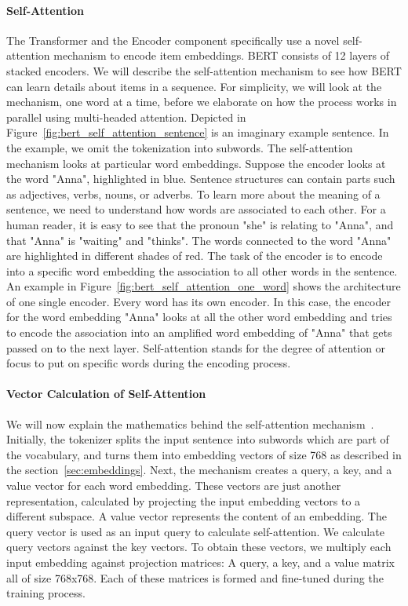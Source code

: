 \paragraph{Self-Attention}
The Transformer and the Encoder component specifically use a novel self-attention mechanism to encode item embeddings. BERT consists of 12 layers of stacked encoders. We will describe the self-attention mechanism to see how BERT can learn details about items in a sequence. For simplicity, we will look at the mechanism, one word at a time, before we elaborate on how the process works in parallel using multi-headed attention. Depicted in Figure~\ref{fig:bert_self_attention_sentence} is an imaginary example sentence. In the example, we omit the tokenization into subwords. The self-attention mechanism looks at particular word embeddings. Suppose the encoder looks at the word "Anna", highlighted in blue. Sentence structures can contain parts such as adjectives, verbs, nouns, or adverbs. To learn more about the meaning of a sentence, we need to understand how words are associated to each other. For a human reader, it is easy to see that the pronoun "she" is relating to "Anna", and that "Anna" is "waiting" and "thinks". The words connected to the word "Anna" are highlighted in different shades of red. The task of the encoder is to encode into a specific word embedding the association to all other words in the sentence. An example in Figure~\ref{fig:bert_self_attention_one_word} shows the architecture of one single encoder. Every word has its own encoder. In this case, the encoder for the word embedding "Anna" looks at all the other word embedding and tries to encode the association into an amplified word embedding of "Anna" that gets passed on to the next layer. Self-attention stands for the degree of attention or focus to put on specific words during the encoding process.

\paragraph{Vector Calculation of Self-Attention}
We will now explain the mathematics behind the self-attention mechanism~\cite{vaswani2017attention,theillustratedtransformer}. Initially, the tokenizer splits the input sentence into subwords which are part of the vocabulary, and turns them into embedding vectors of size 768 as described in the section~\ref{sec:embeddings}. Next, the mechanism creates a query, a key, and a value vector for each word embedding. These vectors are just another representation, calculated by projecting the input embedding vectors to a different subspace. A value vector represents the content of an embedding. The query vector is used as an input query to calculate self-attention. We calculate query vectors against the key vectors. To obtain these vectors, we multiply each input embedding against projection matrices: A query, a key, and a value matrix all of size 768x768. Each of these matrices is formed and fine-tuned during the training process.

